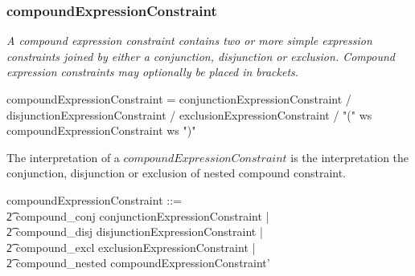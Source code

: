 \documentclass{article}
\def\bnf#1{{\scriptsize {{#1}} }}
\def\desc#1{{\small \textsl{{#1}} }}
\begin{document}
\subsubsection{compoundExpressionConstraint}
\begin{framed}
\desc{A compound expression constraint contains two or more simple expression constraints joined by either a conjunction, disjunction or exclusion. Compound expression constraints may optionally be placed in brackets.}
\end{framed}

\begin{framed}
\noindent
\bnf{	compoundExpressionConstraint = conjunctionExpressionConstraint / 
                               disjunctionExpressionConstraint / 
                               exclusionExpressionConstraint / 			
                               "(" ws compoundExpressionConstraint ws ")"}
\end{framed}

The interpretation of a $compoundExpressionConstraint$ is the interpretation the conjunction, disjunction or exclusion of nested compound constraint.

\begin{zed}
compoundExpressionConstraint ::= \\
\t2 compound\_conj \ldata conjunctionExpressionConstraint \rdata | \\
\t2 compound\_disj \ldata disjunctionExpressionConstraint \rdata | \\
\t2 compound\_excl \ldata exclusionExpressionConstraint \rdata | \\
\t2 compound\_nested \ldata compoundExpressionConstraint' \rdata \\
[compoundExpressionConstraint']
\end{zed}
\end{document}
